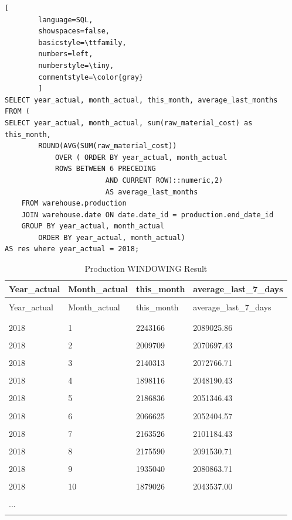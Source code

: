 \documentclass[letterpaper,12pt]{article}
\begin{document}
\begin{lstlisting}[
        language=SQL,
        showspaces=false,
        basicstyle=\ttfamily,
        numbers=left,
        numberstyle=\tiny,
        commentstyle=\color{gray}
        ]			  
SELECT year_actual, month_actual, this_month, average_last_months
FROM (
SELECT year_actual, month_actual, sum(raw_material_cost) as this_month, 
		ROUND(AVG(SUM(raw_material_cost))
			OVER ( ORDER BY year_actual, month_actual
			ROWS BETWEEN 6 PRECEDING
                        AND CURRENT ROW)::numeric,2) 
                        AS average_last_months
	FROM warehouse.production
	JOIN warehouse.date ON date.date_id = production.end_date_id
	GROUP BY year_actual, month_actual
        ORDER BY year_actual, month_actual) 
AS res where year_actual = 2018;
\end{lstlisting}				  

\begingroup
\renewcommand\arraystretch{0.5}
\begin{longtable}{p{2.5cm}p{3cm}p{4cm}p{4cm}}
        \caption{Production WINDOWING Result} \\
	Year\_actual & Month\_actual & this\_month & average\_last\_7\_days \\
        \endfirsthead \\
        Year\_actual & Month\_actual & this\_month & average\_last\_7\_days \\
        \endhead \\
        \hline \\
        2018 & 1 & 2243166 & 2089025.86 \\
        \hline \\
        2018 & 2 & 2009709 & 2070697.43 \\
        \hline \\
        2018 & 3 & 2140313 & 2072766.71 \\
        \hline \\
        2018 & 4 & 1898116 & 2048190.43 \\
        \hline \\
        2018 & 5 & 2186836 & 2051346.43 \\
        \hline \\
        2018 & 6 & 2066625 & 2052404.57 \\
        \hline \\
        2018 & 7 & 2163526 & 2101184.43 \\
        \hline \\
        2018 & 8 & 2175590 & 2091530.71 \\
        \hline \\
        2018 & 9 & 1935040 & 2080863.71 \\
        \hline \\
        2018 & 10 & 1879026 & 2043537.00 \\
        \hline \\
        ... & & & \\
        \hline \\
\end{longtable}
\endgroup
\end{document}
